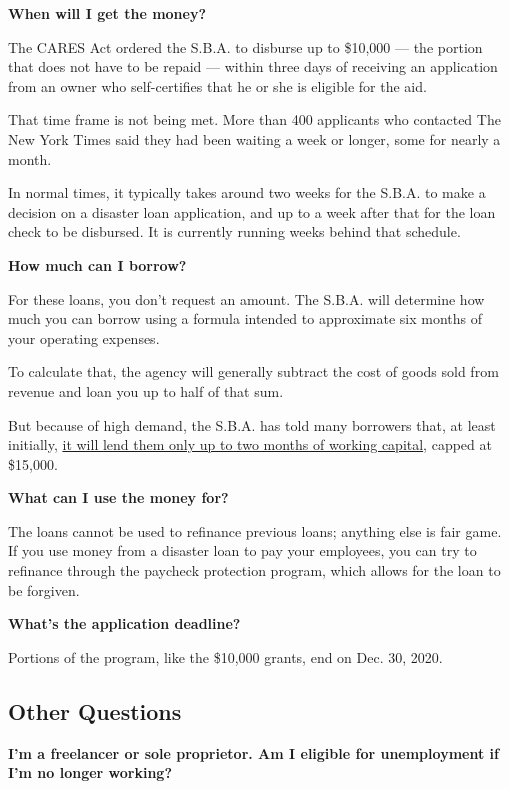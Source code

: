 \textbf{When will I get the money?}

The CARES Act ordered the S.B.A. to disburse up to \$10,000 --- the
portion that does not have to be repaid --- within three days of
receiving an application from an owner who self-certifies that he or she
is eligible for the aid.

That time frame is not being met. More than 400 applicants who contacted
The New York Times said they had been waiting a week or longer, some for
nearly a month.

In normal times, it typically takes around two weeks for the S.B.A. to
make a decision on a disaster loan application, and up to a week after
that for the loan check to be disbursed. It is currently running weeks
behind that schedule.

\textbf{How much can I borrow?}

For these loans, you don't request an amount. The S.B.A. will determine
how much you can borrow using a formula intended to approximate six
months of your operating expenses.

To calculate that, the agency will generally subtract the cost of goods
sold from revenue and loan you up to half of that sum.

But because of high demand, the S.B.A. has told many borrowers that, at
least initially,
\href{https://int.graylady3jvrrxbe.onion/data/documenthelper/6871-sba-note-about-15000-cap/optimized/full.pdf}{it
will lend them only up to two months of working capital}, capped at
\$15,000.

\textbf{What can I use the money for?}

The loans cannot be used to refinance previous loans; anything else is
fair game. If you use money from a disaster loan to pay your employees,
you can try to refinance through the paycheck protection program, which
allows for the loan to be forgiven.

\textbf{What's the application deadline?}

Portions of the program, like the \$10,000 grants, end on Dec. 30, 2020.

\hypertarget{other-questions}{%
\subsection{Other Questions}\label{other-questions}}

\textbf{I'm a freelancer or sole proprietor. Am I eligible for
unemployment if I'm no longer working?}


